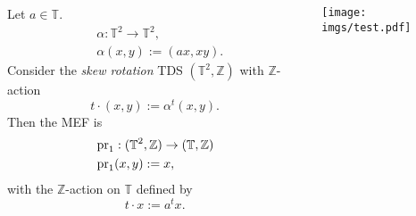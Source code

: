 \begin{frame}
  \begin{columns}
    \begin{column}{0.4\textwidth}
  \begin{example}
Let $a \in \mathbb{T}$.
\begin{equation*}
  \begin{split}
    &\alpha: \mathbb{T}^2 \to \mathbb{T}^2,\\
  &\alpha (x,y) := (ax,xy).
  \end{split}
  \end{equation*}
     Consider the \emph{skew rotation} TDS $(\mathbb{T}^2,\mathbb{Z})$ with $\mathbb{Z}$-action
     \begin{equation*}
     t \cdot (x,y) := \alpha^t (x,y).
     \end{equation*}
     \pause
  Then the MEF is 
  \begin{equation*}
    \begin{split}
     &\operatorname{pr}_1 : (\mathbb{T}^2,\mathbb{Z}) \to (\mathbb{T},\mathbb{Z}) \\
    &\operatorname{pr}_1 (x,y) := x,
    \end{split}
  \end{equation*}
  with the $\mathbb{Z}$-action on $\mathbb{T}$ defined by
  \begin{equation*}
   t\cdot  x := a^t x.
  \end{equation*}
\end{example}
    \end{column}
    \begin{column}{0.6\textwidth}
      \centering
      \texttt{[image: imgs/test.pdf]}
     \end{column}
  \end{columns}
\end{frame}

